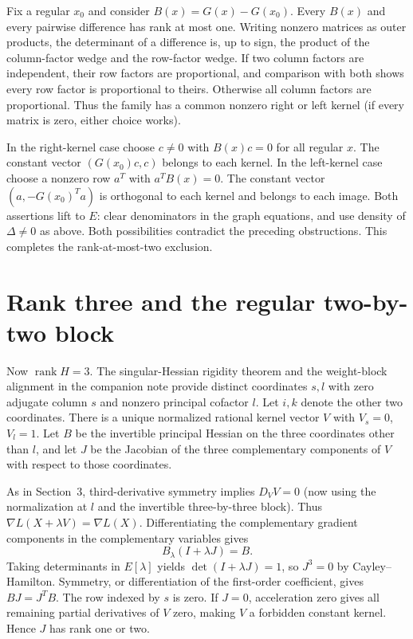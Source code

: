 \documentclass[11pt,a4paper]{article}
\newcommand{\rank}{\operatorname{rank}}
\begin{document}
Fix a regular $x_0$ and consider $B(x)=G(x)-G(x_0)$. Every $B(x)$ and every pairwise difference has rank at most one. Writing nonzero matrices as outer products, the determinant of a difference is, up to sign, the product of the column-factor wedge and the row-factor wedge. If two column factors are independent, their row factors are proportional, and comparison with both shows every row factor is proportional to theirs. Otherwise all column factors are proportional. Thus the family has a common nonzero right or left kernel (if every matrix is zero, either choice works).

In the right-kernel case choose $c\ne0$ with $B(x)c=0$ for all regular $x$. The constant vector $(G(x_0)c,c)$ belongs to each kernel. In the left-kernel case choose a nonzero row $a^T$ with $a^TB(x)=0$. The constant vector $(a,-G(x_0)^Ta)$ is orthogonal to each kernel and belongs to each image. Both assertions lift to $E$: clear denominators in the graph equations, and use density of $\Delta\ne0$ as above. Both possibilities contradict the preceding obstructions. This completes the rank-at-most-two exclusion.

\section{Rank three and the regular two-by-two block}
Now $\rank H=3$. The singular-Hessian rigidity theorem and the weight-block alignment in the companion note provide distinct coordinates $s,l$ with zero adjugate column $s$ and nonzero principal cofactor $l$. Let $i,k$ denote the other two coordinates. There is a unique normalized rational kernel vector $V$ with $V_s=0$, $V_l=1$. Let $B$ be the invertible principal Hessian on the three coordinates other than $l$, and let $J$ be the Jacobian of the three complementary components of $V$ with respect to those coordinates.

As in Section~3, third-derivative symmetry implies $D_VV=0$ (now using the normalization at $l$ and the invertible three-by-three block). Thus $\nabla L(X+\lambda V)=\nabla L(X)$. Differentiating the complementary gradient components in the complementary variables gives
\[
 B_\lambda(I+\lambda J)=B.
\]
Taking determinants in $E[\lambda]$ yields $\det(I+\lambda J)=1$, so $J^3=0$ by Cayley--Hamilton. Symmetry, or differentiation of the first-order coefficient, gives $BJ=J^TB$. The row indexed by $s$ is zero. If $J=0$, acceleration zero gives all remaining partial derivatives of $V$ zero, making $V$ a forbidden constant kernel. Hence $J$ has rank one or two.
\end{document}
